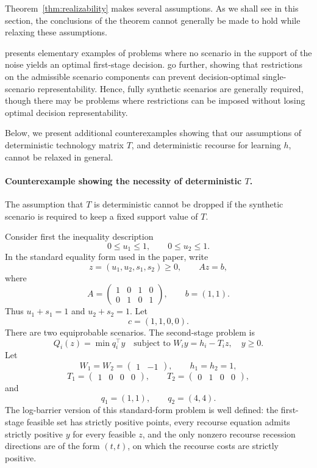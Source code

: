 \documentclass{article}
\newcommand{\1}{\mathbf{1}}
\theoremstyle{plain}
\theoremstyle{definition}
\theoremstyle{remark}
\begin{document}
Theorem~\ref{thm:realizability} makes several assumptions. As we shall see in this section, the conclusions of the theorem cannot generally be made to hold while relaxing these assumptions.

\citet{wallace2000decision} presents elementary examples of problems where no scenario in the support of the noise yields an optimal first-stage decision. \citet{homemdemello2024forecasting} go further, showing that restrictions on the admissible scenario components can prevent decision-optimal single-scenario representability. Hence, fully synthetic scenarios are generally required, though there may be problems where restrictions can be imposed without losing optimal decision representability.

Below, we present additional counterexamples showing that our assumptions of deterministic technology matrix $T$, and deterministic recourse for learning $h$, cannot be relaxed in general.

\paragraph{Counterexample showing the necessity of deterministic $T$.}
\label{app:deterministic-T-counterexample}

The assumption that $T$ is deterministic cannot be dropped if the synthetic scenario is required to keep a fixed support value of $T$.

Consider first the inequality description
\[
0\leq u_1\leq 1,
\qquad
0\leq u_2\leq 1.
\]
In the standard equality form used in the paper, write
\[
z=(u_1,u_2,s_1,s_2)\geq 0,
\qquad
Az=b,
\]
where
\[
A=
\begin{pmatrix}
1&0&1&0\\
0&1&0&1
\end{pmatrix},
\qquad
b=(1,1).
\]
Thus $u_1+s_1=1$ and $u_2+s_2=1$. Let
\[
c=(1,1,0,0).
\]
There are two equiprobable scenarios. The second-stage problem is
\[
Q_i(z)=
\min q_i^\top y
\quad
\text{subject to } W_i y=h_i-T_i z,\quad y\geq 0.
\]
Let
\[
W_1=W_2=
\begin{pmatrix}
1&-1
\end{pmatrix},
\qquad
h_1=h_2=1,
\]
\[
T_1=
\begin{pmatrix}
1&0&0&0
\end{pmatrix},
\qquad
T_2=
\begin{pmatrix}
0&1&0&0
\end{pmatrix},
\]
and
\[
q_1=(1,1),
\qquad
q_2=(4,4).
\]
The log-barrier version of this standard-form problem is well defined: the first-stage feasible set has strictly positive points, every recourse equation admits strictly positive $y$ for every feasible $z$, and the only nonzero recourse recession directions are of the form $(t,t)$, on which the recourse costs are strictly positive.
\end{document}
